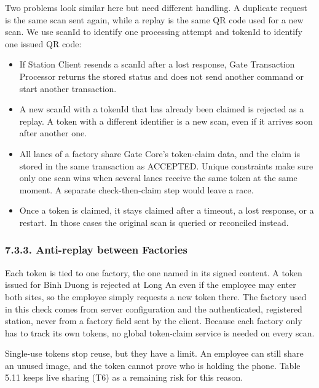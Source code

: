 {}

Two problems look similar here but need different handling. A duplicate request is the same scan sent again, while a replay is the same QR code used for a new scan. We use scanId to identify one processing attempt and tokenId to identify one issued QR code:

\begin{itemize}[leftmargin=36pt, itemsep=2pt, topsep=4pt, parsep=2pt]
  \item If Station Client resends a scanId after a lost response, Gate Transaction Processor returns the stored status and does not send another command or start another transaction.
  \item A new scanId with a tokenId that has already been claimed is rejected as a replay. A token with a different identifier is a new scan, even if it arrives soon after another one.
  \item All lanes of a factory share Gate Core's token-claim data, and the claim is stored in the same transaction as ACCEPTED. Unique constraints make sure only one scan wins when several lanes receive the same token at the same moment. A separate check-then-claim step would leave a race.
  \item Once a token is claimed, it stays claimed after a timeout, a lost response, or a restart. In those cases the original scan is queried or reconciled instead.
\end{itemize}

\subsubsection*{7.3.3. Anti-replay between Factories}

{}

Each token is tied to one factory, the one named in its signed content. A token issued for Binh Duong is rejected at Long An even if the employee may enter both sites, so the employee simply requests a new token there. The factory used in this check comes from server configuration and the authenticated, registered station, never from a factory field sent by the client. Because each factory only has to track its own tokens, no global token-claim service is needed on every scan.

Single-use tokens stop reuse, but they have a limit. An employee can still share an unused image, and the token cannot prove who is holding the phone. Table 5.11 keeps live sharing (T6) as a remaining risk for this reason.

